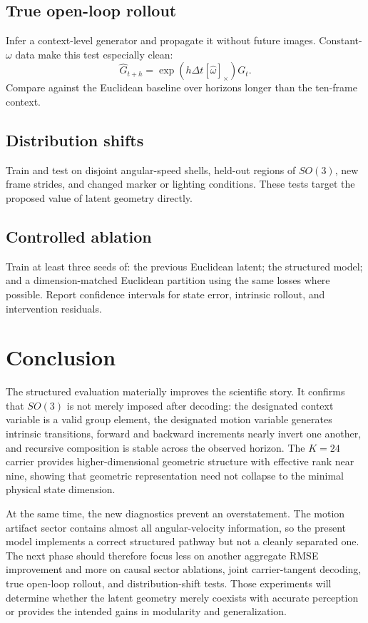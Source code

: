 \documentclass[11pt,a4paper]{article}
\begin{document}
\subsection{True open-loop rollout}
Infer a context-level generator and propagate it without future images. Constant-$\omega$ data make this test especially clean:
\begin{equation}
\hat G_{t+h}=\exp(h\Delta t[\hat\omega]_\times)G_t.
\end{equation}
Compare against the Euclidean baseline over horizons longer than the ten-frame context.

\subsection{Distribution shifts}
Train and test on disjoint angular-speed shells, held-out regions of $SO(3)$, new frame strides, and changed marker or lighting conditions. These tests target the proposed value of latent geometry directly.

\subsection{Controlled ablation}
Train at least three seeds of: the previous Euclidean latent; the structured model; and a dimension-matched Euclidean partition using the same losses where possible. Report confidence intervals for state error, intrinsic rollout, and intervention residuals.

\section{Conclusion}
The structured evaluation materially improves the scientific story. It confirms that $SO(3)$ is not merely imposed after decoding: the designated context variable is a valid group element, the designated motion variable generates intrinsic transitions, forward and backward increments nearly invert one another, and recursive composition is stable across the observed horizon. The $K=24$ carrier provides higher-dimensional geometric structure with effective rank near nine, showing that geometric representation need not collapse to the minimal physical state dimension.

At the same time, the new diagnostics prevent an overstatement. The motion artifact sector contains almost all angular-velocity information, so the present model implements a correct structured pathway but not a cleanly separated one. The next phase should therefore focus less on another aggregate RMSE improvement and more on causal sector ablations, joint carrier-tangent decoding, true open-loop rollout, and distribution-shift tests. Those experiments will determine whether the latent geometry merely coexists with accurate perception or provides the intended gains in modularity and generalization.
\end{document}
